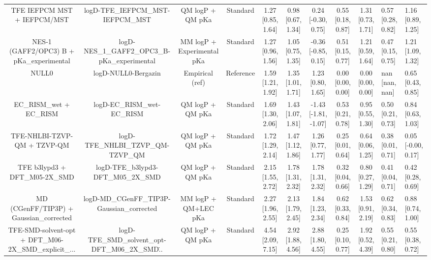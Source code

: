 \documentclass{article}
\begin{document}
\begin{center}
\begin{longtable}{|ccccccccc|}
                       TFE IEFPCM MST + IEFPCM/MST &                  logD-TFE\_IEFPCM\_MST-IEFPCM\_MST &                      QM logP + QM pKa &   Standard &  1.27 [0.85, 1.64] &  0.98 [0.67, 1.34] &    0.24 [-0.30, 0.75] &  0.55 [0.18, 0.87] &  1.31 [0.73, 1.71] &   0.57 [0.28, 0.82] &   1.16 [0.89, 1.25] \\
           NES-1 (GAFF2/OPC3) B + pKa_experimental &      logD-NES\_1\_GAFF2\_OPC3\_B-pKa\_experimental &            MM logP + Experimental pKa &   Standard &  1.27 [0.96, 1.56] &  1.05 [0.75, 1.35] &   -0.36 [-0.85, 0.15] &  0.51 [0.15, 0.77] &  1.21 [0.59, 1.64] &   0.47 [0.15, 0.75] &   1.21 [1.09, 1.32] \\
                                             NULL0 &                                logD-NULL0-Bergazin &                       Empirical (ref) &  Reference &  1.59 [1.21, 1.92] &  1.35 [1.01, 1.71] &     1.23 [0.80, 1.65] &  0.00 [0.00, 0.00] &  0.00 [0.00, 0.00] &      nan [nan, nan] &   0.65 [0.43, 0.85] \\
                             EC_RISM_wet + EC_RISM &                        logD-EC\_RISM\_wet-EC\_RISM &                      QM logP + QM pKa &   Standard &  1.69 [1.30, 2.06] &  1.43 [1.07, 1.81] &  -1.43 [-1.81, -1.07] &  0.53 [0.21, 0.78] &  0.95 [0.55, 1.30] &   0.50 [0.21, 0.73] &   0.84 [0.63, 1.03] \\
                       TFE-NHLBI-TZVP-QM + TZVP-QM &                 logD-TFE\_NHLBI\_TZVP\_QM-TZVP\_QM &                      QM logP + QM pKa &   Standard &  1.72 [1.29, 2.14] &  1.47 [1.12, 1.86] &     1.26 [0.77, 1.77] &  0.25 [0.01, 0.64] &  0.64 [0.06, 1.25] &   0.38 [0.01, 0.71] &  0.05 [-0.00, 0.17] \\
                      TFE b3lypd3 + DFT_M05-2X_SMD &                logD-TFE\_b3lypd3-DFT\_M05\_2X\_SMD &                      QM logP + QM pKa &   Standard &  2.15 [1.55, 2.72] &  1.78 [1.31, 2.32] &     1.78 [1.31, 2.32] &  0.32 [0.04, 0.66] &  0.80 [0.27, 1.29] &   0.41 [0.04, 0.71] &   0.42 [0.28, 0.69] \\
            MD (CGenFF/TIP3P) + Gaussian_corrected &         logD-MD\_CGenFF\_TIP3P-Gaussian\_corrected &                  MM logP + QM+LEC pKa &   Standard &  2.27 [1.96, 2.55] &  2.13 [1.79, 2.45] &     1.84 [1.23, 2.34] &  0.62 [0.33, 0.84] &  1.53 [0.91, 2.19] &   0.62 [0.34, 0.83] &   0.88 [0.74, 1.00] \\
 TFE-SMD-solvent-opt + DFT_M06-2X_SMD_explicit_... &  logD-TFE\_SMD\_solvent\_opt-DFT\_M06\_2X\_SMD\... &                      QM logP + QM pKa &   Standard &  4.54 [2.09, 7.15] &  2.92 [1.88, 4.56] &     2.88 [1.80, 4.55] &  0.25 [0.10, 0.77] &  1.92 [0.52, 4.39] &   0.55 [0.21, 0.80] &   0.55 [0.38, 0.72] \\
\end{longtable}
\end{center}
\end{document}
